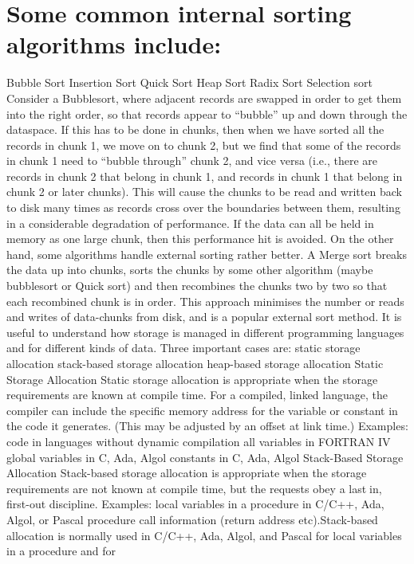 \documentclass{article}
\begin{document}
\section{Some common internal sorting algorithms include:}
Bubble Sort Insertion Sort Quick Sort Heap Sort 
Radix Sort Selection sort Consider a Bubblesort, 
where adjacent records are swapped in order to get 
them into the right order, so that records appear to 
“bubble” up and down through the dataspace. If this 
has to be done in chunks, then when we have sorted 
all the records in chunk 1, we move on to chunk 2, but 
we find that some of the records in chunk 1 need to “bubble through” chunk 2, and vice versa (i.e., there 
are records in chunk 2 that belong in chunk 1, and 
records in chunk 1 that belong in chunk 2 or later 
chunks). This will cause the chunks to be read and 
written back to disk many times as records cross over 
the boundaries between them, resulting in a 
considerable degradation of performance. If the data 
can all be held in memory as one large chunk, then 
this performance hit is avoided. On the other hand, 
some algorithms handle external sorting rather better. 
A Merge sort breaks the data up into chunks, sorts the 
chunks by some other algorithm (maybe bubblesort or 
Quick sort) and then recombines the chunks two by 
two so that each recombined chunk is in order. This 
approach minimises the number or reads and writes of 
data-chunks from disk, and is a popular external sort 
method. It is useful to understand how storage is 
managed in different programming languages and for 
different kinds of data. Three important cases are: 
static storage allocation stack-based storage allocation 
heap-based storage allocation Static Storage 
Allocation Static storage allocation is appropriate 
when the storage requirements are known at compile 
time. For a compiled, linked language, the compiler 
can include the specific memory address for the 
variable or constant in the code it generates. (This 
may be adjusted by an offset at link time.) Examples: 
code in languages without dynamic compilation all 
variables in FORTRAN IV global variables in C, Ada, 
Algol constants in C, Ada, Algol Stack-Based Storage 
Allocation Stack-based storage allocation is 
appropriate when the storage requirements are not 
known at compile time, but the requests obey a lastin, first-out discipline. Examples: local variables in a 
procedure in C/C++, Ada, Algol, or Pascal procedure 
call information (return address etc).Stack-based 
allocation is normally used in C/C++, Ada, Algol, and 
Pascal for local variables in a procedure and for 
\end{document}
